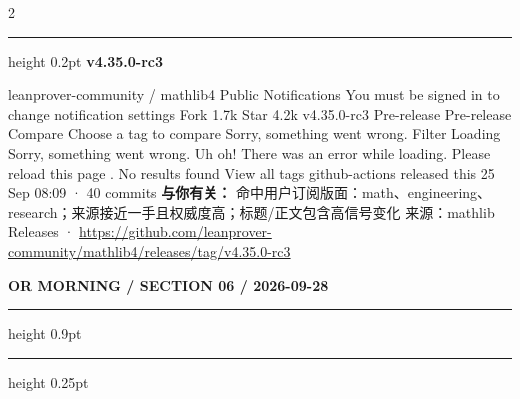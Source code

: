 \documentclass[10.5pt]{ctexart}
\begin{document}
\begin{multicols}{2}
\hrule height 0.2pt
\vspace{2mm}
{\large\bfseries v4.35.0-rc3}\par
leanprover-community / mathlib4 Public Notifications You must be signed in to change notification settings Fork 1.7k Star 4.2k v4.35.0-rc3 Pre-release Pre-release Compare Choose a tag to compare Sorry, something went wrong. Filter Loading Sorry, something went wrong. Uh oh! There was an error while loading. Please reload this page . No results found View all tags github-actions released this 25 Sep 08:09 · 40 commits
\textbf{与你有关：} 命中用户订阅版面：math、engineering、research；来源接近一手且权威度高；标题/正文包含高信号变化
{\footnotesize\color{ormuted} 来源：mathlib Releases · \url{https://github.com/leanprover-community/mathlib4/releases/tag/v4.35.0-rc3}}
\end{multicols}
\newpage
{\small\bfseries OR MORNING / SECTION 06 / 2026-09-28}
\vspace{2mm}
\hrule height 0.9pt
\vspace{1.5mm}
\hrule height 0.25pt
\vspace{4mm}
\end{document}
